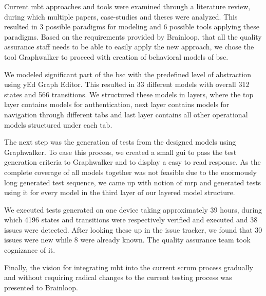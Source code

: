\par
Current \acrshort{mbt} approaches and tools were examined through a literature review, during which multiple papers, case-studies and theses were analyzed. This resulted in 3 possible paradigms for modeling and 6 possible tools applying these paradigms. Based on the requirements provided by Brainloop, that all the quality assurance staff needs to be able to easily apply the new approach, we chose the tool Graphwalker to proceed with creation of behavioral models of \acrshort{bsc}.

\par
We modeled significant part of the \acrshort{bsc} with the predefined level of abstraction using yEd Graph Editor. This resulted in 33 different models with overall 312 states and 566 transitions. We structured these models in layers, where the top layer contains models for authentication, next layer contains models for navigation through different tabs and last layer contains all other operational models structured under each tab.

\par
The next step was the generation of tests from the designed models using Graphwalker. To ease this process, we created a small \acrshort{gui} to pass the test generation criteria to Graphwalker and to display a easy to read response. As the complete coverage of all models together was not feasible due to the enormously long generated test sequence, we came up with notion of \acrshort{mrp} and generated tests using it for every model in the third layer of our layered model structure.

\par
We executed tests generated on one device taking approximately 39 hours, during which 4196 states and transitions were respectively verified and executed and 38 issues were detected. After looking these up in the issue tracker, we found that 30 issues were new while 8 were already known. The quality assurance team took cognizance of it.

\par
Finally, the vision for integrating \acrshort{mbt} into the current scrum process gradually and without requiring radical changes to the current testing process was presented to Brainloop.
 








 


